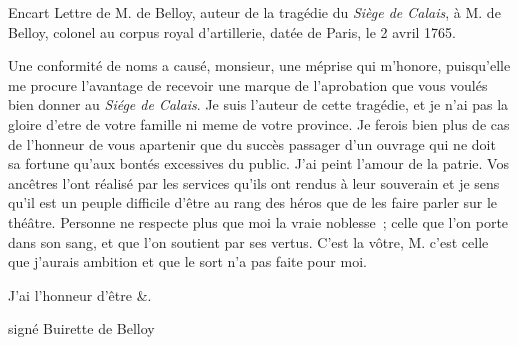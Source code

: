                      \begin{diary}{Encart}{} Lettre de M. de
                                 Belloy,
                              auteur de la tragédie
                              du \emph{Siège de Calais}, à
                              M. de Belloy, colonel au
                              corpus royal d'artillerie,
                              datée de Paris, le 2 avril 1765. \bigskip
                
                 Une conformité de noms a
                              causé, monsieur, une méprise
                              qui m'honore, puisqu'elle me
                              procure l'avantage de recevoir
                              une marque de l'aprobation
                              que vous voulés bien donner au
                              \emph{Siége de Calais}. Je suis l'auteur
                              de cette tragédie, et je n'ai pas
                              la gloire d'etre de votre famille
                              ni meme de votre province. Je
                              ferois bien plus de cas de l'honneur
                              de vous apartenir que du succès
                              passager d'un ouvrage qui ne doit sa fortune qu'aux
                              bontés
                              excessives du public. J'ai peint
                              l'amour de la patrie. Vos ancêtres
                              l'ont réalisé par les services
                              qu'ils ont rendus à leur souverain
                              et je sens qu'il est un peuple
                              difficile d'être au rang des
                              héros que de les faire parler
                              sur le théâtre. Personne ne
                              respecte plus que moi la vraie
                              noblesse ; celle que l'on porte dans
                              son sang, et que l'on soutient par
                              ses vertus. C'est la vôtre, M.
                              c'est celle que j'aurais ambition
                              et que le sort n'a pas faite pour
                              moi. \bigskip
        
        
                                 J'ai l'honneur d'être &.\bigskip
                
                \begin{flushright}
                                 signé Buirette de
                                    Belloy
                              \end{flushright}\end{diary}

